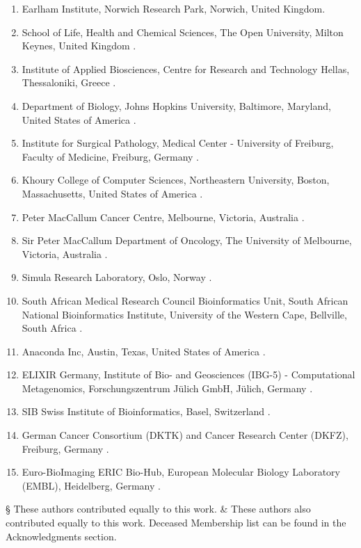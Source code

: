 \begin{enumerate}
\item Earlham Institute, Norwich Research Park, Norwich, United Kingdom.\label{gtn-affil:16}
\item School of Life, Health and Chemical Sciences, The Open University, Milton Keynes, United Kingdom .\label{gtn-affil:17}
\item Institute of Applied Biosciences, Centre for Research and Technology Hellas, Thessaloniki, Greece .\label{gtn-affil:18}
\item Department of Biology, Johns Hopkins University, Baltimore, Maryland, United States of America .\label{gtn-affil:19}
\item Institute for Surgical Pathology, Medical Center - University of Freiburg, Faculty of Medicine, Freiburg, Germany .\label{gtn-affil:20}
\item Khoury College of Computer Sciences, Northeastern University, Boston, Massachusetts, United States of America .\label{gtn-affil:21}
\item Peter MacCallum Cancer Centre, Melbourne, Victoria, Australia .\label{gtn-affil:22}
\item Sir Peter MacCallum Department of Oncology, The University of Melbourne, Victoria, Australia .\label{gtn-affil:23}
\item Simula Research Laboratory, Oslo, Norway .\label{gtn-affil:24}
\item South African Medical Research Council Bioinformatics Unit, South African National Bioinformatics Institute, University of the Western Cape, Bellville, South Africa .\label{gtn-affil:25}
\item Anaconda Inc, Austin, Texas, United States of America .\label{gtn-affil:26}
\item ELIXIR Germany, Institute of Bio- and Geosciences (IBG-5) - Computational Metagenomics, Forschungszentrum Jülich GmbH, Jülich, Germany .\label{gtn-affil:27}
\item SIB Swiss Institute of Bioinformatics, Basel, Switzerland .\label{gtn-affil:28}
\item German Cancer Consortium (DKTK) and Cancer Research Center (DKFZ), Freiburg, Germany .\label{gtn-affil:29}
\item Euro-BioImaging ERIC Bio-Hub, European Molecular Biology Laboratory (EMBL), Heidelberg, Germany .\label{gtn-affil:30}
\end{enumerate}


§ These authors contributed equally to this work.
\& These authors also contributed equally to this work.
\dag Deceased
\textpilcrow Membership list can be found in the Acknowledgments section.

